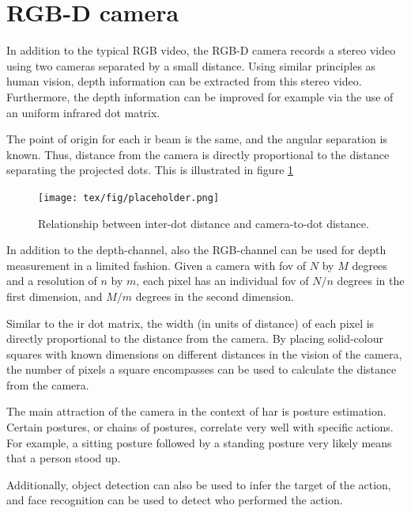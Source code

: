 \section{RGB-D camera}
In addition to the typical RGB video,
the RGB-D camera records a stereo video using two cameras separated by a small distance.
Using similar principles as human vision,
depth information can be extracted from this stereo video.
Furthermore, the depth information can be improved
for example via the use of an uniform infrared dot matrix.

The point of origin for each \gls{ir} beam is the same,
and the angular separation is known.
Thus, distance from the camera is directly proportional to the distance
separating the projected dots.
This is illustrated in figure \ref{fig:ir-dot-matrix}

\begin{figure}
    \centering
    \texttt{[image: tex/fig/placeholder.png]}
    \caption{Relationship between inter-dot distance and camera-to-dot distance.}
    \label{fig:ir-dot-matrix}
\end{figure}

In addition to the depth-channel,
also the RGB-channel can be used for depth measurement in a limited fashion.
Given a camera with \gls{fov} of $N$ by $M$ degrees
and a resolution of $n$ by $m$,
each pixel has an individual \gls{fov} of $N/n$ degrees in the first dimension,
and $M/m$ degrees in the second dimension.

Similar to the \gls{ir} dot matrix,
the width (in units of distance) of each pixel is directly proportional
to the distance from the camera.
By placing solid-colour squares with known dimensions on different distances
in the vision of the camera,
the number of pixels a square encompasses 
can be used to calculate the distance from the camera.

The main attraction of the camera in the context of \gls{har}
is posture estimation.
Certain postures, or chains of postures,
correlate very well with specific actions.
For example, a sitting posture followed by a standing posture 
very likely means that a person stood up.

Additionally, object detection can also be used to infer the target of the action,
and face recognition can be used to detect who performed the action.

